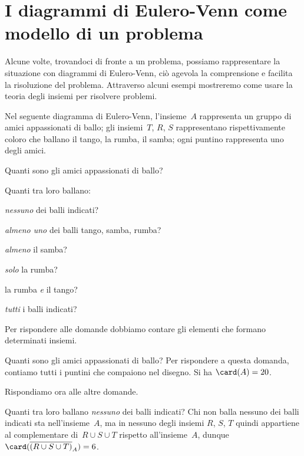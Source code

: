 \section{I diagrammi di Eulero-Venn come modello di un problema}
Alcune volte, trovandoci di fronte a un problema, possiamo rappresentare
la situazione con diagrammi di Eulero-Venn, ciò agevola la
comprensione e facilita la risoluzione del problema. Attraverso alcuni
esempi mostreremo come usare la teoria degli insiemi per risolvere
problemi.

\begin{exrig}
 \begin{esempio}
Nel seguente diagramma di Eulero-Venn, l'insieme~$A$ rappresenta un gruppo di amici appassionati di ballo; gli insiemi~$T$, $R$,
$S$ rappresentano rispettivamente coloro che ballano il tango, la rumba, il samba; ogni puntino rappresenta uno degli amici.
\begin{multicols}{2}
Quanti sono gli amici appassionati di ballo?

Quanti tra loro ballano:
\begin{enumeratea}
\item \emph{nessuno} dei balli indicati?
\item \emph{almeno uno} dei balli tango, samba, rumba?
\item \emph{almeno} il samba?
\item \emph{solo} la rumba?
\item la rumba \emph{e} il tango?
\item \emph{tutti} i balli indicati?
\end{enumeratea}
\begin{center}
 
\end{center}
\end{multicols}

Per rispondere alle domande dobbiamo contare gli elementi che formano determinati insiemi.

Quanti sono gli amici appassionati di ballo? Per rispondere a questa
domanda, contiamo tutti i puntini che compaiono nel disegno. Si ha 
$\card(A)=20$.

Rispondiamo ora alle altre domande.
\begin{enumeratea}
\item Quanti tra loro ballano \emph{nessuno} dei balli indicati?
Chi non balla nessuno dei balli indicati sta nell'insieme~$A$, ma in nessuno degli insiemi
$R$, $S$, $T$ quindi appartiene al complementare
di~$R\cup S\cup T$ rispetto all'insieme~$A$,
dunque~$\card(\overline{({R\cup S\cup T})}_{A})=6$.


\end{enumeratea}
\end{esempio}
\end{exrig}
